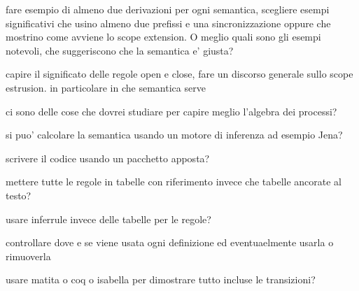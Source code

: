 
fare esempio di almeno due derivazioni per ogni semantica, scegliere esempi significativi che usino almeno due prefissi e una sincronizzazione oppure che mostrino come avviene lo scope extension.
O meglio quali sono gli esempi notevoli, che suggeriscono che la semantica e' giusta?

capire il significato delle regole open e close, fare un discorso generale sullo scope estrusion. in particolare in che semantica serve

ci sono delle cose che dovrei studiare per capire meglio l'algebra dei processi?

si puo' calcolare la semantica usando un motore di inferenza ad esempio Jena?

scrivere il codice usando un pacchetto apposta?

mettere tutte le regole in tabelle con riferimento invece che tabelle ancorate al testo?

usare inferrule invece delle tabelle per le regole?

controllare dove e se viene usata ogni definizione ed eventuaelmente usarla o rimuoverla

usare matita o coq o isabella per dimostrare tutto incluse le transizioni?

